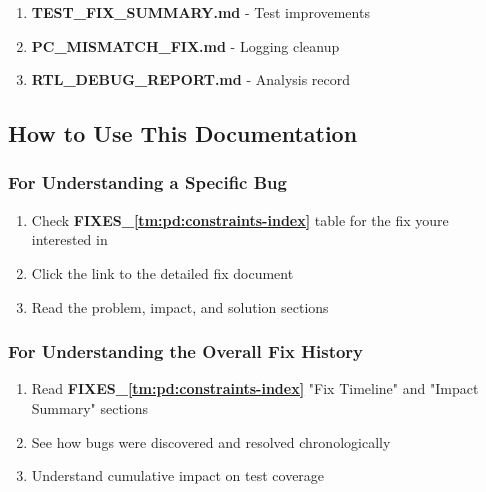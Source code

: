 \begin{record}

\begin{enumerate}
\def\labelenumi{\arabic{enumi}.}
\setcounter{enumi}{5}
\tightlist
\item
  \textbf{TEST\_\allowbreak{}FIX\_\allowbreak{}SUMMARY.md} - Test
  improvements
\item
  \textbf{PC\_\allowbreak{}MISMATCH\_\allowbreak{}FIX.md} - Logging
  cleanup
\item
  \textbf{RTL\_\allowbreak{}DEBUG\_\allowbreak{}REPORT.md} - Analysis
  record
\end{enumerate}

\end{record}

\subsection{How to Use This Documentation}\label{cr:fix:fixes-readme:how-to-use-this-documentation}

\subsubsection{For Understanding a Specific Bug}\label{cr:fix:fixes-readme:for-understanding-a-specific-bug}

\begin{record}

\begin{enumerate}
\def\labelenumi{\arabic{enumi}.}
\tightlist
\item
  Check \textbf{FIXES\_\allowbreak{}\cref{tm:pd:constraints-index}} table for the fix
  you\textquotesingle re interested in
\item
  Click the link to the detailed fix document
\item
  Read the problem, impact, and solution sections
\end{enumerate}

\end{record}

\subsubsection{For Understanding the Overall Fix History}\label{cr:fix:fixes-readme:for-understanding-the-overall-fix-history}

\begin{record}

\begin{enumerate}
\def\labelenumi{\arabic{enumi}.}
\tightlist
\item
  Read \textbf{FIXES\_\allowbreak{}\cref{tm:pd:constraints-index}} "Fix Timeline" and "Impact
  Summary" sections
\item
  See how bugs were discovered and resolved chronologically
\item
  Understand cumulative impact on test coverage
\end{enumerate}

\end{record}

